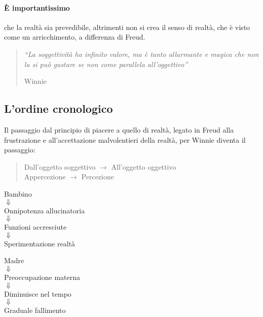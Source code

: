 \documentclass[12pt, a4paper]{article}
\begin{document}
\paragraph{\`E importantissimo} che la realt\`a sia prevedibile, altrimenti non si crea il senso di realt\`a, che \`e visto come un arricchimento, a differenza di Freud.

\begin{quote}
\emph{``La soggettivit\`a ha infinito valore, ma \`e tanto allarmante e magica che non la si può gustare se non come parallela all'oggettivo''}
    \begin{flushright}
        Winnie
    \end{flushright}
\end{quote}

\subsection{L'ordine cronologico}

Il passaggio dal principio di piacere a quello di realt\`a, legato in Freud alla frustrazione e all'accettazione malvolentieri della realt\`a, per Winnie diventa il passaggio:

\begin{quote}
    \begin{center}
    Dall'oggetto soggettivo  $\rightarrow$ All'oggetto oggettivo \\
    Appercezione $\rightarrow$ Percezione
    \end{center}
\end{quote}
\bigskip
\begin{minipage}{.45\textwidth}
    \begin{flushleft}
        \begin{center}
Bambino\\
$\Downarrow$\\
Onnipotenza allucinatoria\\
$\Downarrow$\\
Funzioni accresciute\\
$\Downarrow$\\
Sperimentazione realt\`a
        \end{center}
    \end{flushleft}
\end{minipage}
\begin{minipage}{.45\textwidth}
    \begin{flushright}
        \begin{center}
Madre\\
$\Downarrow$\\
Preoccupazione materna\\
$\Downarrow$\\
Diminuisce nel tempo\\
$\Downarrow$\\
Graduale fallimento 
        \end{center}
    \end{flushright}
\end{minipage}
\end{document}
